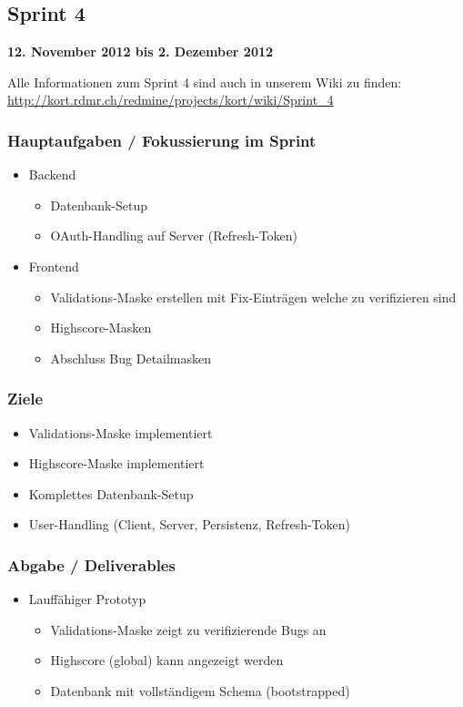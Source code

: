 \subsection{Sprint 4}

\textbf{12. November 2012 bis 2. Dezember 2012}

Alle Informationen zum Sprint 4 sind auch in unserem Wiki zu finden:
\url{http://kort.rdmr.ch/redmine/projects/kort/wiki/Sprint_4}

\subsubsection{Hauptaufgaben / Fokussierung im Sprint}

\begin{itemize}
	\item Backend
	\begin{itemize}
		\item Datenbank-Setup
		\item OAuth-Handling auf Server (Refresh-Token)
	\end{itemize}
	\item Frontend
	\begin{itemize}
		\item Validations-Maske erstellen mit Fix-Einträgen welche zu verifizieren sind
		\item Highscore-Masken
		\item Abschluss Bug Detailmasken
	\end{itemize}
\end{itemize}

\subsubsection{Ziele}
\begin{itemize}
	\item Validations-Maske implementiert
	\item Highscore-Maske implementiert
	\item Komplettes Datenbank-Setup
	\item User-Handling (Client, Server, Persistenz, Refresh-Token)
\end{itemize}

\subsubsection{Abgabe / Deliverables}

\begin{itemize}
	\item Lauffähiger Prototyp
	\begin{itemize}
		\item Validations-Maske zeigt zu verifizierende Bugs an
		\item Highscore (global) kann angezeigt werden
		\item Datenbank mit vollständigem Schema (bootstrapped)
	\end{itemize}
\end{itemize}

